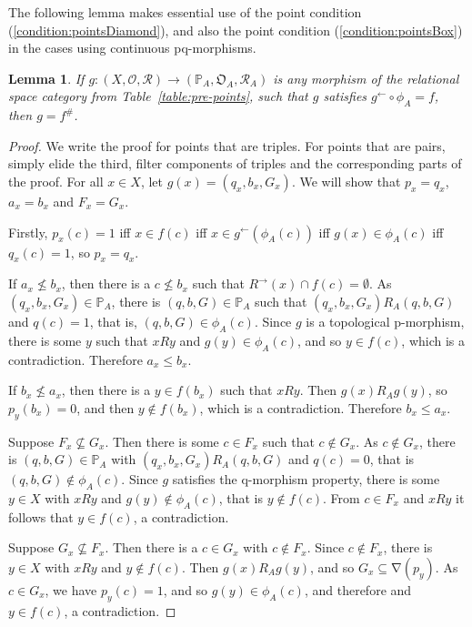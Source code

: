 \documentclass{article}[a4paper]
\newtheorem{lemma}{Lemma}%
\theoremstyle{definition}
\newcommand{\relsp}{\mathbf{RelSp}}
\DeclareMathOperator{\charop}{\nabla}
\newcommand{\dirim}{^{\rightarrow\!}}
\begin{document}
The following lemma makes essential use of the point condition (\ref{condition:pointsDiamond}), and also the point condition (\ref{condition:pointsBox}) in the cases using continuous pq-morphisms.

\begin{lemma}
\label{strmorphunique}
If $g:(X, \mathcal{O} ,\mathcal{R} ) \rightarrow 
( \mathbb{P}_A , \mathfrak{O} _A , \mathcal{R} _A )$ is any morphism of the relational space category from Table~\ref{table:pre-points}, such that $g$ satisfies 
$g^{\leftarrow} \circ \phi _A =f$, then $g=f^{\#}$.
\end{lemma}

\begin{proof}
We write the proof for points that are triples. For points that are pairs, simply elide the third, filter components of triples and the corresponding parts of the proof.
For all $x \in X$, let 
$g(x)= (q_x , b_x , G_x)$. 
We will show that 
$p_x = q_x$, $a_x =b_x $ and $F _x = G _x $.

Firstly, $p_x (c)=1$ iff $x \in f(c)$ iff 
$x \in g^{\leftarrow} ( \phi _A (c))$ 
iff $g(x) \in \phi _A (c)$ iff $q_x (c)=1$, so $p_x = q_x$.

If $a_x \nleq b_x$, then there 
is a $c \nleq b_x$ such that 
$R\dirim(x) \cap f(c) = \emptyset$. 
As $(q_x , b_x , G_x) \in \mathbb{P} _A$, there is $(q,b,G) \in \mathbb{P} 
_A$ such that $(q_x , b_x , G_x) R_A  (q,b,G)$ and $q(c)=1$, that is, $(q,b,G)  \in 
\phi _A (c)$. Since $g$ is a topological p-morphism, there is some 
$y$ such that 
$xR y$ and $g(y) \in \phi _A (c)$, and so $y \in f(c)$, which is a 
contradiction. Therefore $a_x \leq b_x$. 

If $b_x \nleq a_x$, then there is a $y \in f(b_x)$ such that 
$xR y$. Then $g(x) R_A g(y)$, so $p_y(b_x)=0$, and then   
$y \notin f(b_x)$, which is a contradiction. Therefore 
$b_x \leq a_x$. 

Suppose $F_x \not \subseteq G_x$. Then there is some $c \in F_x$ such that $c \notin G_x$. As $c \notin G_x$, there is 
$(q,b,G) \in \mathbb{P} _A$ with $(q_x , b_x , G_x) R_A (q,b,G)$ and $q(c)=0$, 
that is $(q,b,G) \notin \phi _A(c)$. Since $g$ satisfies the q-morphism 
property, there is some $y \in X$ with $xR y$ and $g(y) \notin \phi _A 
(c)$, that is $y \notin f(c)$. From $c \in F_x$ and $xRy$ it follows that $y \in f(c)$, a contradiction. 

Suppose $G_x \not \subseteq F_x$. Then there is a $c \in G_x$ with 
$c \notin F_x$. Since $c \notin F_x$, there is $y \in X$ with 
$xR y$ and $y \notin f(c)$. Then $g(x)R_A g(y)$, and so $G_x \subseteq \charop (p_y)$. As $c \in G_x$, we have $p_y(c)=1$, and so $g(y) \in \phi _A(c)$, and therefore and $y \in f(c)$, a contradiction. 
\end{proof}
\end{document}
